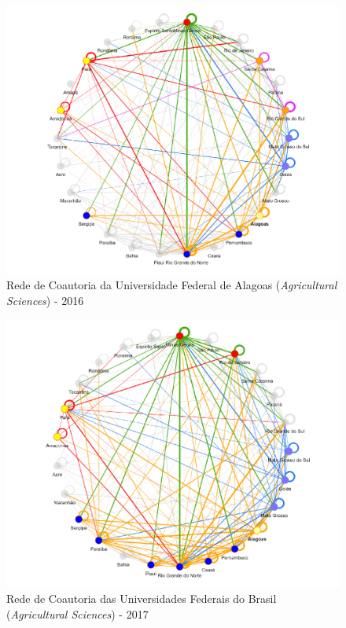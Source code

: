 \begin{figure}[H]
	\centering
	\includegraphics[width=\linewidth]{Imagens/rede-agr-AL-2016.pdf}
	\caption{Rede de Coautoria da Universidade Federal de Alagoas (\textit{Agricultural Sciences}) - 2016}
	\label{Rede de Coautoria - UF AGRI AL 2016}
\end{figure}

\begin{figure}[H]
	\centering
	\includegraphics[width=\linewidth]{Imagens/rede-agr-AL-2017.pdf}
	\caption{Rede de Coautoria das Universidades Federais do Brasil (\textit{Agricultural Sciences}) - 2017}
	\label{Rede de Coautoria - UF AGRI AL 2017}
\end{figure}

